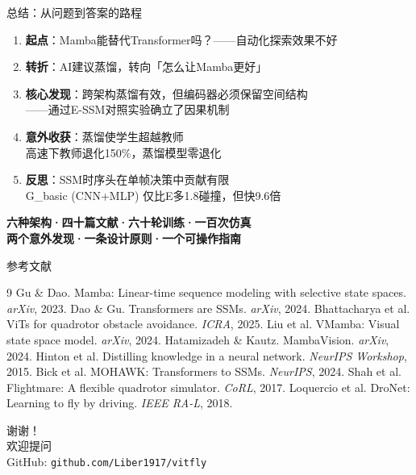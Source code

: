 \documentclass[aspectratio=169,10pt]{beamer}
\newcommand{\HL}[1]{\textcolor{emphasis}{#1}}
\begin{document}
\begin{frame}{总结：从问题到答案的路程}
\begin{enumerate}
\item \textbf{起点}：Mamba能替代Transformer吗？——自动化探索效果不好
\item \textbf{转折}：AI建议蒸馏，转向「怎么让Mamba更好」
\item \textbf{核心发现}：\HL{跨架构蒸馏有效，但编码器必须保留空间结构}\\
\footnotesize ——通过E-SSM对照实验确立了因果机制
\item \textbf{意外收获}：\HL{蒸馏使学生超越教师}\\
\footnotesize 高速下教师退化150\%，蒸馏模型零退化
\item \textbf{反思}：\HL{SSM时序头在单帧决策中贡献有限}\\
\footnotesize G\_basic (CNN+MLP) 仅比E多1.8碰撞，但快9.6倍
\end{enumerate}
\vspace{0.3cm}
\begin{center}
\large\textbf{六种架构·四十篇文献·六十轮训练·一百次仿真}\\
\textbf{两个意外发现·一条设计原则·一个可操作指南}
\end{center}
\end{frame}

\begin{frame}{参考文献}
\footnotesize
\begin{thebibliography}{9}
 Gu \& Dao. Mamba: Linear-time sequence modeling with selective state spaces. \textit{arXiv}, 2023.
 Dao \& Gu. Transformers are SSMs. \textit{arXiv}, 2024.
 Bhattacharya et al. ViTs for quadrotor obstacle avoidance. \textit{ICRA}, 2025.
 Liu et al. VMamba: Visual state space model. \textit{arXiv}, 2024.
 Hatamizadeh \& Kautz. MambaVision. \textit{arXiv}, 2024.
 Hinton et al. Distilling knowledge in a neural network. \textit{NeurIPS Workshop}, 2015.
 Bick et al. MOHAWK: Transformers to SSMs. \textit{NeurIPS}, 2024.
 Shah et al. Flightmare: A flexible quadrotor simulator. \textit{CoRL}, 2017.
 Loquercio et al. DroNet: Learning to fly by driving. \textit{IEEE RA-L}, 2018.
\end{thebibliography}
\end{frame}

\begin{frame}[plain]
\begin{center}
\Huge 谢谢！\\[1cm]
\Large 欢迎提问\\[1.5cm]
\normalsize GitHub: \texttt{github.com/Liber1917/vitfly}
\end{center}
\end{frame}
\end{document}
